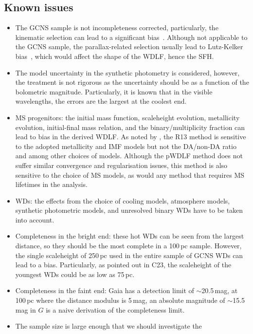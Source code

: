 \documentclass[fleqn,usenatbib]{mnras}
\begin{document}
\subsection*{Known issues}
\begin{itemize}
    \item The GCNS sample is not incompleteness corrected, particularly, the
    kinematic selection can lead to a significant 
    bias~\citep{2015MNRAS.450.4098L}. Although not applicable to the GCNS
    sample, the parallax-related selection usually lead to Lutz-Kelker 
    bias~\citep{1973PASP...85..573L}, which would affect the shape of the
    WDLF, hence the SFH.
    \item The model uncertainty in the synthetic photometry is considered,
    however, the treatment is not rigorous as the uncertainty should be as
    a function of the bolometric magnitude. Particularly, it is known that
    in the visible wavelengths, the errors are the largest at the coolest end.
    \item MS progenitors: the initial mass function, scaleheight evolution,
    metallicity evolution, initial-final mass relation, and the
    binary/multiplicity fraction can lead to bias in the derived WDLF. As
    noted by \citet{2019ApJ...878L..11I}, the R13 method is sensitive to the
    adopted metallicity and IMF models but not the DA/non-DA ratio and among
    other choices of models. Although the pWDLF method does not suffer similar
    convergence and regularisation issues, this method is also sensitive to
    the choice of MS models, as would any method that requires MS lifetimes
    in the analysis.
    \item WDs: the effects from the choice of cooling models, atmosphere
    models, synthetic photometric models, and unresolved binary WDs have to be
    taken into account.
    \item Completeness in the bright end: these hot WDs can be seen from the
    largest distance, so they should be the most complete in a 100\,pc
    sample. However, the single scaleheight of 250\,pc used in the entire
    sample of GCNS WDs can lead to a bias. Particularly, as pointed out in
    C23, the scaleheight of the youngest WDs could be
    as low as 75\,pc.
    \item Completeness in the faint end: Gaia has a detection limit of
    $\sim$20.5\,mag, at 100\,pc where the distance modulus is 5\,mag, an
    absolute magnitude of $\sim$15.5\,mag in $G$ is a naive derivation of the
    completeness limit.
    \item The sample size is large enough that we should investigate the

\end{itemize}
\end{document}
